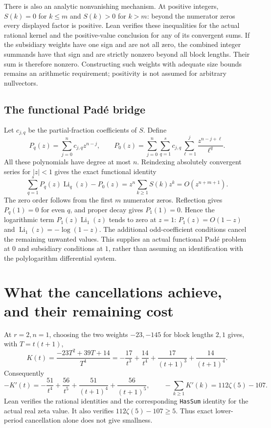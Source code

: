\documentclass[11pt]{article}
\begin{document}
There is also an analytic nonvanishing mechanism. At positive integers,
$S(k)=0$ for $k\le m$ and $S(k)>0$ for $k>m$: beyond the numerator
zeros every displayed factor is positive. Lean verifies these inequalities
for the actual rational kernel and the positive-value conclusion for any
of its convergent sums. If the subsidiary weights have one sign and are
not all zero, the combined integer summands have that sign and are
strictly nonzero beyond all block lengths. Their sum is therefore nonzero.
Constructing such weights with adequate size bounds remains an arithmetic
requirement; positivity is not assumed for arbitrary nullvectors.

\subsection{The functional Pad\'e bridge}
Let $c_{j,q}$ be the partial-fraction coefficients of $S$. Define
\[
 P_q(z)=\sum_{j=0}^n c_{j,q}z^{n-j},\qquad
 P_0(z)=\sum_{j=0}^n\sum_{q=1}^s c_{j,q}
              \sum_{\ell=1}^j\frac{z^{n-j+\ell}}{\ell^q}.
\]
All these polynomials have degree at most $n$. Reindexing absolutely
convergent series for $|z|<1$ gives the exact functional identity
\begin{equation}
 \sum_{q=1}^sP_q(z)\operatorname{Li}_q(z)-P_0(z)
 =z^n\sum_{k\ge1}S(k)z^k=O(z^{n+m+1}).
 \label{eq:functional}
\end{equation}
The zero order follows from the first $m$ numerator zeros.
Reflection gives $P_q(1)=0$ for even $q$, and proper decay gives
$P_1(1)=0$. Hence the logarithmic term
$P_1(z)\operatorname{Li}_1(z)$ tends to zero at $z=1$:
$P_1(z)=O(1-z)$ and $\operatorname{Li}_1(z)=-\log(1-z)$.
The additional odd-coefficient conditions cancel the remaining unwanted
values. This supplies an actual functional Pad\'e problem at $0$ and
subsidiary conditions at $1$, rather than assuming an identification with
the polylogarithm differential system.

\section{What the cancellations achieve, and their remaining cost}
At $r=2,n=1$, choosing the two weights $-23,-145$ for block lengths
$2,1$ gives, with $T=t(t+1)$,
\[
 K(t)=\frac{-23T^2+39T+14}{T^4}
 =-\frac{17}{t^3}+\frac{14}{t^4}
   +\frac{17}{(t+1)^3}+\frac{14}{(t+1)^4}.
\]
Consequently
\[
 -K'(t)=-\frac{51}{t^4}+\frac{56}{t^5}
         +\frac{51}{(t+1)^4}+\frac{56}{(t+1)^5},
 \qquad -\sum_{k\ge1}K'(k)=112\zeta(5)-107.
\]
Lean verifies the rational identities and the corresponding
\texttt{HasSum} identity for the actual real zeta value.
It also verifies $112\zeta(5)-107\ge5$.
Thus exact lower-period cancellation alone does not give smallness.
\end{document}
